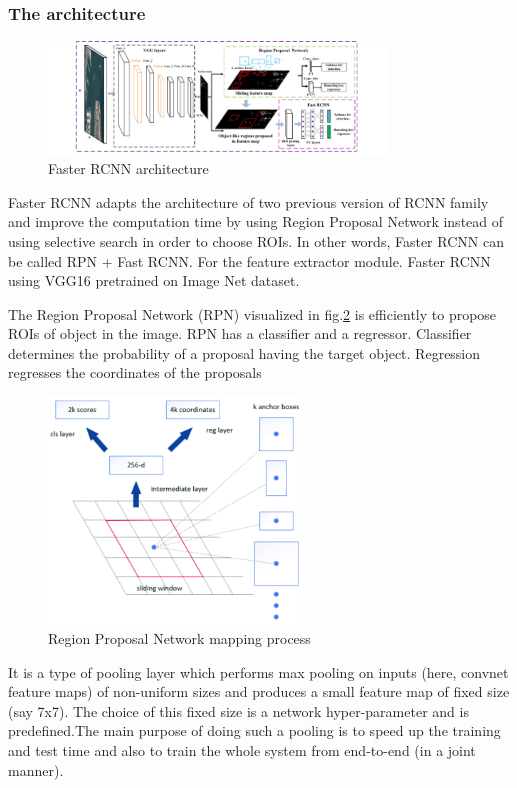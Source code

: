 \subsubsection{The architecture}
\begin{figure}[h!]
    \centering
    \includegraphics[width=0.8\textwidth]{Chapters/Fig/FrRCNN_arch.png}
    \caption{Faster RCNN architecture}
    \label{fig:frrcnn_arc}
\end{figure}
Faster RCNN adapts the architecture of two previous version of RCNN family and improve the computation time by using Region Proposal Network instead of using selective search in order to choose ROIs. In other words, Faster RCNN can be called RPN + Fast RCNN. For the feature extractor module. Faster RCNN using VGG16 pretrained on Image Net dataset.\par
The Region Proposal Network (RPN) visualized in fig.\ref{fig:RPN} is efficiently to propose ROIs of object in the image. RPN has a classifier and a regressor. Classifier determines the probability of a proposal having the target object. Regression regresses the coordinates of the proposals
\begin{figure}[h!]
    \centering
    \includegraphics[width=0.6\textwidth]{Chapters/Fig/RPN_arc_1.png}
    \caption{Region Proposal Network mapping process}
    \label{fig:RPN}
\end{figure}
\par
It is a type of pooling layer which performs max pooling on inputs (here, convnet feature maps) of non-uniform sizes and produces a small feature map of fixed size (say 7x7). The choice of this fixed size is a network hyper-parameter and is predefined.The main purpose of doing such a pooling is to speed up the training and test time and also to train the whole system from end-to-end (in a joint manner).

